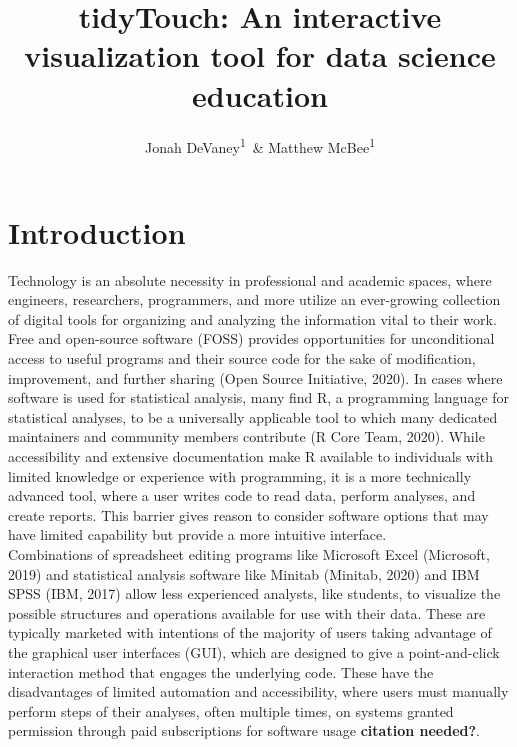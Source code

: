 \documentclass[english,man,floatsintext]{apa6}
\author{Jonah DeVaney\textsuperscript{1}\ \& Matthew McBee\textsuperscript{1}}
\affiliation{
\vspace{0.5cm}
\textsuperscript{1} East Tennesse State University}
\title{tidyTouch: An interactive visualization tool for data science education}
\date{}
\begin{document}
\maketitle

\hypertarget{introduction}{%
\section{Introduction}\label{introduction}}

Technology is an absolute necessity in professional and academic spaces, where engineers, researchers, programmers, and more utilize an ever-growing collection of digital tools for organizing and analyzing the information vital to their work. Free and open-source software (FOSS) provides opportunities for unconditional access to useful programs and their source code for the sake of modification, improvement, and further sharing (Open Source Initiative, 2020). In cases where software is used for statistical analysis, many find R, a programming language for statistical analyses, to be a universally applicable tool to which many dedicated maintainers and community members contribute (R Core Team, 2020). While accessibility and extensive documentation make R available to individuals with limited knowledge or experience with programming, it is a more technically advanced tool, where a user writes code to read data, perform analyses, and create reports. This barrier gives reason to consider software options that may have limited capability but provide a more intuitive interface.\\
Combinations of spreadsheet editing programs like Microsoft Excel (Microsoft, 2019) and statistical analysis software like Minitab (Minitab, 2020) and IBM SPSS (IBM, 2017) allow less experienced analysts, like students, to visualize the possible structures and operations available for use with their data. These are typically marketed with intentions of the majority of users taking advantage of the graphical user interfaces (GUI), which are designed to give a point-and-click interaction method that engages the underlying code. These have the disadvantages of limited automation and accessibility, where users must manually perform steps of their analyses, often multiple times, on systems granted permission through paid subscriptions for software usage \textbf{citation needed?}.\\
\end{document}
